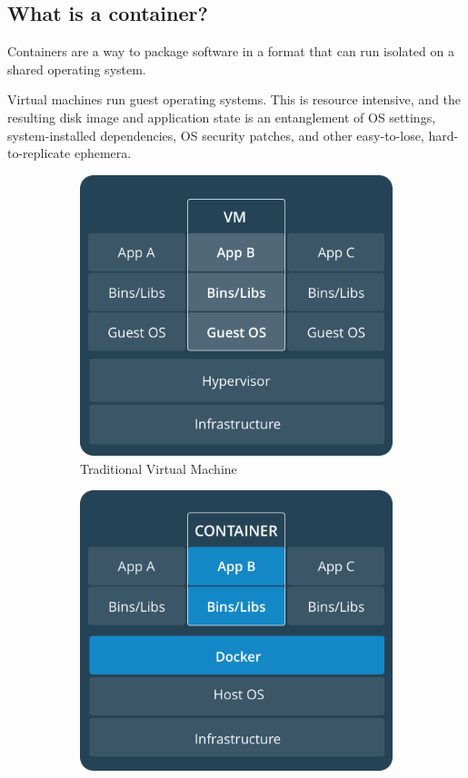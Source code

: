 \documentclass{exam}
\begin{document}
\subsection{What is a container?}

Containers are a way to package software in a format that can run isolated on a shared operating system.

Virtual machines run guest operating systems.
This is resource intensive, and the resulting disk image and application state is an entanglement of OS settings, system-installed dependencies, OS security patches, and other easy-to-lose, hard-to-replicate ephemera.

\begin{figure}[!htb]
	\centering
	\begin{subfigure}[!htb]{0.495\textwidth}
		\includegraphics[width=\linewidth]{VM.png}
        \caption{Traditional Virtual Machine}
        \label{fig:VM}
    \end{subfigure}
    \hfill
	\begin{subfigure}[!htb]{0.495\textwidth}
		\includegraphics[width=\linewidth]{Container.png}

\end{subfigure}
\end{figure}
\end{document}
